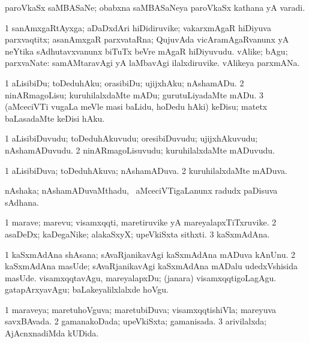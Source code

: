 \bentry
{}
\gl{\nA}
\bmng
paroVkaSx saMBASaNe; obabxna saMBASaNeya paroVkaSx kathana yA varadi. 
\emng
\eentry

\bentry
{}
\gl{\nA}
\bmng
\bnum
\num{1} sanAmxgaRtAyxga; aDaDxdAri hiDidiruvike; vakarxmAgaR hiDiyuva parxvaqtitx; asanAmxgaR parxvataRna; QujuvAda vicAramAgaRvanunx yA neYtika sAdhutavxvanunx biTuTx beVre mAgaR hiDiyuvudu. 
 vAlike; bAgu; parxvaNate: 
\banum
{} samAMtaravAgi yA laMbavAgi ilalxdiruvike. 
 vAlikeya parxmANa. 
\eanum
\numie
\enum
\emng
\eentry

\bentry
{}
\gl{\sakirx}
\bmng
\bnum
\num{1} aLisibiDu; toDeduhAku; orasibiDu; ujijxhAku; nAshamADu. 
\num{2} ninARmagoLisu; kuruhilalxdaMte mADu; gurutuLiyadaMte mADu. 
\num{3} (aMceciVTi \mo vugaLa meVle masi baLidu, hoDedu hAki) keDisu; matetx baLasadaMte keDisi hAku. 
\enum
\emng
\eentry

\bentry
{}
\gl{\nA}
\bmng
\bnum
\num{1} aLisibiDuvudu; toDeduhAkuvudu; oresibiDuvudu; ujijxhAkuvudu; nAshamADuvudu. 
\num{2} ninARmagoLisuvudu; kuruhilalxdaMte mADuvudu. 
\enum
\emng
\eentry

\bentry
{}
\gl{\gu}
\bmng
% 
\bnum
\num{1} aLisibiDuva; toDeduhAkuva; nAshamADuva. 
\num{2} kuruhilalxdaMte mADuva. 
\enum
\emng
\eentry

\bentry
{}
\gl{\nA}
\bmng
nAshaka; nAshamADuvaMthadu, \kanmu\ aMceciVTigaLanunx radudx paDisuva sAdhana. 
\emng
\eentry

\bentry
{}
\gl{\nA}
\bmng
% 
\bnum
\num{1} marave; marevu; visamxqqti, maretiruvike yA mareyalapxTiTxruvike. 
\num{2} asaDeDx; kaDegaNike; alakaSxyX; upeVkiSxta sithxti. 
\num{3} kaSxmAdAna. 
\enum
\emng

\noindent
\gl{\pagu}
\bmng
\bnum
\num{1}  kaSxmAdAna shAsana; sAvaRjanikavAgi kaSxmAdAna mADuva kAnUnu. 
\num{2}  kaSxmAdAna masUde; sAvaRjanikavAgi kaSxmAdAna mADalu udedxVshisida masUde. 
  
\banum
{} visamxqqtavAgu, mareyalapxDu; (janara) visamxqqtigoLagAgu. 
 gatapArxyavAgu; baLakeyalilxlalxde hoVgu. 
\eanum
\numie
\enum
\emng
\eentry

\bentry
{}
\gl{\gu}
\bmng
% 
\bnum
\num{1} maraveya; maretuhoVguva; maretubiDuva; visamxqqtishiVla; mareyuva savxBAvada. 
\num{2} gamanakoDada; upeVkiSxta; gamanisada. 
\num{3} arivilalxda; AjAcnxnadiMda kUDida. 
\enum
\emng
\eentry

